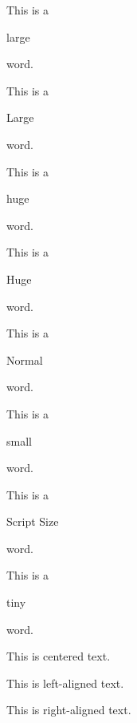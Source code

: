 \documentclass[11pt]{article}
\begin{document}
This is a \begin{large}large\end{large} word.

This is a \begin{Large}Large\end{Large} word.

This is a \begin{huge}huge\end{huge} word.

This is a \begin{Huge}Huge\end{Huge} word.

This is a \begin{normalsize}Normal\end{normalsize} word.

This is a \begin{small}small\end{small} word.

This is a \begin{scriptsize}Script Size\end{scriptsize} word.

This is a \begin{tiny}tiny\end{tiny} word.

\vspace{1cm}

\begin{center}
    This is centered text.
\end{center}

\begin{flushleft}
    This is left-aligned text.
\end{flushleft}

\begin{flushright}
    This is right-aligned text.
\end{flushright}








\vspace{1cm}
\end{document}
